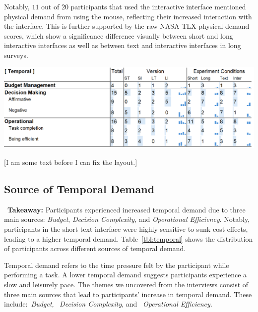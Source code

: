 Notably, $11$ out of $20$ participants that used the interactive interface mentioned physical demand from using the mouse, reflecting their increased interaction with the interface. This is further supported by the raw NASA-TLX physical demand scores, which show a significance difference visually between short and long interactive interfaces as well as between text and interactive interfaces in long surveys. 

\newpage %
\begin{table}[h]
    \caption{Temporal Demand Table, needs to be updated with some new terms definitions for some of the columns.}
    \label{tbl:temporal}
    \includegraphics[width=\linewidth]{content/image/cog/temporal_table.png}
\end{table}

[I am some text before I can fix the layout.]

\subsection{Source of Temporal Demand} 
\label{sec:temporal}
\vspace{5pt}

\begin{tldrbox}
    \faInfoCircle~\xspace\textbf{Takeaway:} Participants experienced increased temporal demand due to three main sources: \textit{Budget}, \textit{Decision Complexity}, and \textit{Operational Efficiency}. Notably, participants in the short text interface were highly sensitive to sunk cost effects, leading to a higher temporal demand. Table~\ref{tbl:temporal} shows the distribution of participants across different sources of temporal demand.
\end{tldrbox}

Temporal demand refers to the time pressure felt by the participant while performing a task. A lower temporal demand suggests participants experience a slow and leisurely pace. The themes we uncovered from the interviews consist of three main sources that lead to participants' increase in temporal demand. These include:~\textit{Budget}, ~\textit{Decision Complexity}, and ~\textit{Operational Efficiency}. 

